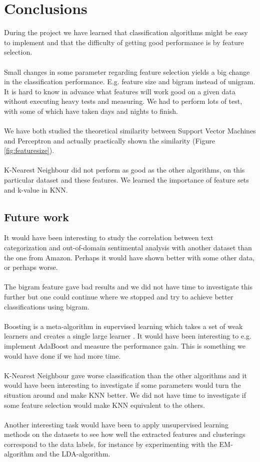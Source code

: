 \chapter{Conclusions}
During the project we have learned that classification algorithms might be easy to implement and that the difficulty of getting good performance is by feature selection. \\\\
Small changes in some parameter regarding feature selection yields a big change in the classification performance. E.g. feature size and bigram instead of unigram. It is hard to know in advance what features will work good on a given data without executing heavy tests and measuring. We had to perform lots of test, with some of which have taken days and nights to finish.
\\\\
We have both studied the theoretical similarity between Support Vector Machines and Perceptron and actually practically shown the similarity (Figure \ref{fig:featuresize}).
\\\\
K-Nearest Neighbour did not perform as good as the other algorithms, on this particular dataset and these features. We learned the importance of feature sets and k-value in KNN.
\section{Future work}
It would have been interesting to study the correlation between text categorization and out-of-domain sentimental analysis with another dataset than the one from Amazon. Perhaps it would have shown better with some other data, or perhaps worse. \\\\
The bigram feature gave bad results and we did not have time to investigate this further but one could continue where we stopped and try to achieve better classifications using bigram. \\\\
Boosting is a meta-algorithm in supervised learning which takes a set of weak learners and creates a single large learner \citep{boosting}. It would have been interesting to e.g. implement AdaBoost and measure the performance gain. This is something we would have done if we had more time. \\\\
K-Nearest Neighbour gave worse classification than the other algorithms and it would have been interesting to investigate if some parameters would turn the situation around and make KNN better. We did not have time to investigate if some feature selection would make KNN equivalent to the others.
\\\\
Another interesting task would have been to apply unsupervised learning methods on the datasets to see how well the extracted features and clusterings correspond to the data labels, for instance by experimenting with the EM-algorithm and the LDA-algorithm.
